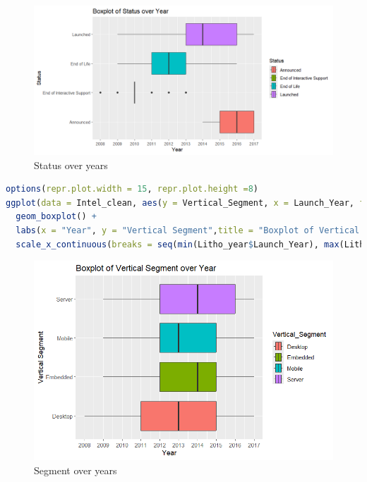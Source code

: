 \begin{figure}[ht]
  \centering
  \includegraphics[width=1\linewidth]{img/Status_Year.png}
  \vspace{1pt}
  \caption{Status over years}
\end{figure}

\begin{lstlisting}[language=R]
options(repr.plot.width = 15, repr.plot.height =8) 
ggplot(data = Intel_clean, aes(y = Vertical_Segment, x = Launch_Year, fill = Vertical_Segment)) +
  geom_boxplot() +
  labs(x = "Year", y = "Vertical Segment",title = "Boxplot of Vertical Segment over Year") +
  scale_x_continuous(breaks = seq(min(Litho_year$Launch_Year), max(Litho_year$Launch_Year), by = 1))
\end{lstlisting}

\begin{figure}[ht]
  \centering
  \includegraphics[width=1\linewidth]{img/VSegment_Year.png}
  \vspace{1pt}
  \caption{Segment over years}
\end{figure}

